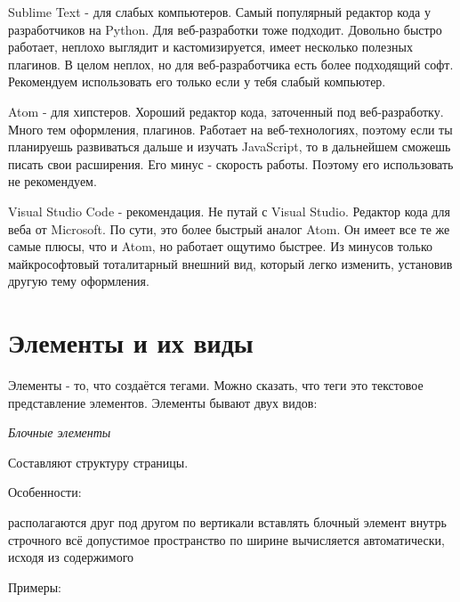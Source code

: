 \documentclass[14pt]{extreport}
\begin{document}
Sublime Text -  для слабых компьютеров.
Самый популярный редактор кода у разработчиков на Python. Для веб-разработки тоже подходит. Довольно быстро работает, неплохо выглядит и кастомизируется, имеет несколько полезных плагинов. В целом неплох, но для веб-разработчика есть более подходящий софт. Рекомендуем использовать его только если у тебя слабый компьютер.

Atom - для хипстеров.
Хороший редактор кода, заточенный под веб-разработку. Много тем оформления, плагинов. Работает на веб-технологиях, поэтому если ты планируешь развиваться дальше и изучать JavaScript, то в дальнейшем сможешь писать свои расширения. Его минус - скорость работы. Поэтому его использовать не рекомендуем.

Visual Studio Code - рекомендация.
Не путай с Visual Studio. Редактор кода для веба от Microsoft. По сути, это более быстрый аналог Atom. Он имеет все те же самые плюсы, что и Atom, но работает ощутимо быстрее. Из минусов только майкрософтовый тоталитарный внешний вид, который легко изменить, установив другую тему оформления.



\section{Элементы и их виды}

Элементы - то, что создаётся тегами. Можно сказать, что теги это текстовое представление элементов. Элементы бывают двух видов:

\emph{Блочные элементы}

Составляют структуру страницы.

Особенности:
\begin{itemize}
 располагаются друг под другом по вертикали
 вставлять блочный элемент внутрь строчного
 всё допустимое пространство по ширине
 вычисляется автоматически, исходя из содержимого
\end{itemize}

Примеры:
\end{document}
